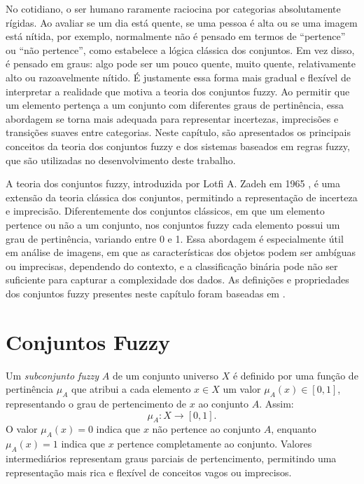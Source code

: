 No cotidiano, o ser humano raramente raciocina por categorias absolutamente rígidas. Ao avaliar se um dia está quente, se uma pessoa é alta ou se uma imagem está nítida, por exemplo, normalmente não é pensado em termos de “pertence” ou “não pertence”, como estabelece a lógica clássica dos conjuntos. Em vez disso, é pensado em graus: algo pode ser um pouco quente, muito quente, relativamente alto ou razoavelmente nítido. É justamente essa forma mais gradual e flexível de interpretar a realidade que motiva a teoria dos conjuntos fuzzy. Ao permitir que um elemento pertença a um conjunto com diferentes graus de pertinência, essa abordagem se torna mais adequada para representar incertezas, imprecisões e transições suaves entre categorias. Neste capítulo, são apresentados os principais conceitos da teoria dos conjuntos fuzzy e dos sistemas baseados em regras fuzzy, que são utilizadas no desenvolvimento deste trabalho.

A teoria dos conjuntos fuzzy, introduzida por Lotfi A. Zadeh em 1965 \cite{zadeh1965fuzzy}, é uma extensão da teoria clássica dos conjuntos, permitindo a representação de incerteza e imprecisão. Diferentemente dos conjuntos clássicos, em que um elemento pertence ou não a um conjunto, nos conjuntos fuzzy cada elemento possui um grau de pertinência, variando entre 0 e 1. Essa abordagem é especialmente útil em análise de imagens, em que as características dos objetos podem ser ambíguas ou imprecisas, dependendo do contexto, e a classificação binária pode não ser suficiente para capturar a complexidade dos dados. As definições e propriedades dos conjuntos fuzzy presentes neste capítulo foram baseadas em .

\section{Conjuntos Fuzzy}
Um \textit{subconjunto fuzzy} $A$ de um conjunto universo $X$ é definido por uma função de pertinência $\mu_A$ que atribui a cada elemento $x \in X$ um valor $\mu_A(x) \in [0, 1]$, representando o grau de pertencimento de $x$ ao conjunto $A$. Assim:
$$
\mu_A: X \rightarrow [0, 1].
$$
O valor $\mu_A(x) = 0$ indica que $x$ não pertence ao conjunto $A$, enquanto $\mu_A(x) = 1$ indica que $x$ pertence completamente ao conjunto. Valores intermediários representam graus parciais de pertencimento, permitindo uma representação mais rica e flexível de conceitos vagos ou imprecisos.

